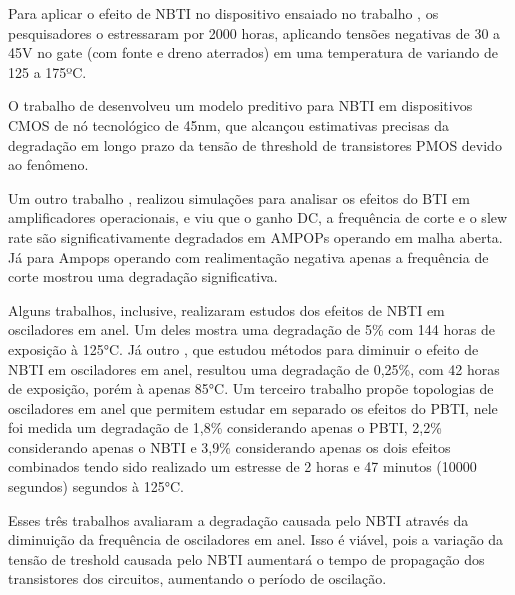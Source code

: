 Para aplicar o efeito de NBTI no dispositivo ensaiado no trabalho \cite{Davidovic}, os pesquisadores o estressaram por 2000 horas, aplicando tensões negativas de 30 a 45V no gate (com fonte e dreno aterrados) em uma temperatura de variando de 125 a 175ºC.

O trabalho de \cite{Bhardwaj} desenvolveu um modelo preditivo para NBTI em dispositivos CMOS de nó tecnológico de 45nm, que alcançou estimativas precisas da degradação em longo prazo da tensão de threshold de transistores PMOS devido ao fenômeno.

Um outro trabalho \cite{Grossi}, realizou simulações para analisar os efeitos do BTI em amplificadores operacionais, e viu que o ganho DC, a frequência de corte e o slew rate são significativamente degradados em AMPOPs operando em malha aberta. Já para Ampops operando com realimentação negativa apenas a frequência de corte mostrou uma degradação significativa.

Alguns trabalhos, inclusive, realizaram estudos dos efeitos de NBTI em osciladores em anel. Um deles \cite{Lorenz} mostra uma degradação de 5\% com 144 horas de exposição à 125°C. Já outro \cite{Sato}, que estudou métodos para diminuir o efeito de NBTI em osciladores em anel, resultou uma degradação de 0,25\%, com 42 horas de exposição, porém à apenas 85°C. Um terceiro trabalho \cite{Linder} propõe topologias de osciladores em anel que permitem estudar em separado os efeitos do PBTI, nele foi medida um degradação de 1,8\% considerando apenas o PBTI, 2,2\% considerando apenas o NBTI e 3,9\%  considerando apenas os dois efeitos combinados tendo sido realizado um estresse de 2 horas e 47 minutos (10000 segundos) segundos à 125°C.

Esses três trabalhos avaliaram a degradação causada pelo NBTI através da diminuição da frequência de osciladores em anel. Isso é viável, pois a variação da tensão de treshold causada pelo NBTI aumentará o tempo de propagação dos transistores dos circuitos, aumentando o período de oscilação. 